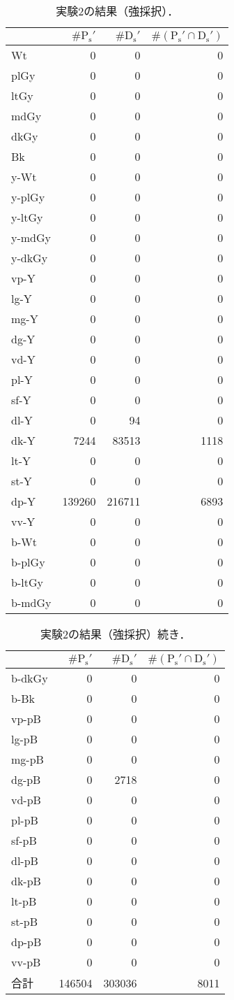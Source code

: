 \documentclass[uplatex,paper=a4,fontsize=4.0truemm,jafontsize=4.0truemm,head_space=30.0truemm,foot_space=30.0truemm,baselineskip=8.0truemm,line_length=40zw,gutter=25.0truemm,oneside,openany,fleqn,hanging_panctuation,open_bracket_pos=nibu_tentsuki,dvipdfmx,jis2004,book,titlepage]{jlreq}
\theoremstyle{mystyle}
\newcommand{\zwspace}{\hspace{1zw}\relax}
\newcommand{\captiondot}[1]{\caption{#1．}}
\newcommand{\tableinput}[4]{\begin{table}[btp]\centering\captiondot{#3}\label{tab:#4}\begin{tabular}{#1}#2\end{tabular}\end{table}}
\newcommand{\parentheses}[1]{\left(#1\right)}
\begin{document}
			\clearpage
			\tableinput{l|rrr}{ & \(\#\textrm{P}_\textrm{s}'\) & \(\#\textrm{D}_\textrm{s}'\) & \(\#\parentheses{\textrm{P}_\textrm{s}'\cap\textrm{D}_\textrm{s}'}\) \\ \hline
				Wt & 0 & 0 & 0 \\
				plGy & 0 & 0 & 0 \\
				ltGy & 0 & 0 & 0 \\
				mdGy & 0 & 0 & 0 \\
				dkGy & 0 & 0 & 0 \\
				Bk & 0 & 0 & 0 \\
				y-Wt & 0 & 0 & 0 \\
				y-plGy & 0 & 0 & 0 \\
				y-ltGy & 0 & 0 & 0 \\
				y-mdGy & 0 & 0 & 0 \\
				y-dkGy & 0 & 0 & 0 \\
				vp-Y & 0 & 0 & 0 \\
				lg-Y & 0 & 0 & 0 \\
				mg-Y & 0 & 0 & 0 \\
				dg-Y & 0 & 0 & 0 \\
				vd-Y & 0 & 0 & 0 \\
				pl-Y & 0 & 0 & 0 \\
				sf-Y & 0 & 0 & 0 \\
				dl-Y & 0 & 94 & 0 \\
				dk-Y & 7244 & 83513 & 1118 \\
				lt-Y & 0 & 0 & 0 \\
				st-Y & 0 & 0 & 0 \\
				dp-Y & 139260 & 216711 & 6893 \\
				vv-Y & 0 & 0 & 0 \\
				b-Wt & 0 & 0 & 0 \\
				b-plGy & 0 & 0 & 0 \\
				b-ltGy & 0 & 0 & 0 \\
				b-mdGy & 0 & 0 & 0}{実験2の結果（強採択）}{result23}
			\tableinput{l|rrr}{ & \(\#\textrm{P}_\textrm{s}'\) & \(\#\textrm{D}_\textrm{s}'\) & \(\#\parentheses{\textrm{P}_\textrm{s}'\cap\textrm{D}_\textrm{s}'}\) \\ \hline
				b-dkGy & 0 & 0 & 0 \\
				b-Bk & 0 & 0 & 0 \\
				vp-pB & 0 & 0 & 0 \\
				lg-pB & 0 & 0 & 0 \\
				mg-pB & 0 & 0 & 0 \\
				dg-pB & 0 & 2718 & 0 \\
				vd-pB & 0 & 0 & 0 \\
				pl-pB & 0 & 0 & 0 \\
				sf-pB & 0 & 0 & 0 \\
				dl-pB & 0 & 0 & 0 \\
				dk-pB & 0 & 0 & 0 \\
				lt-pB & 0 & 0 & 0 \\
				st-pB & 0 & 0 & 0 \\
				dp-pB & 0 & 0 & 0 \\
				vv-pB & 0 & 0 & 0 \\ \hline
				合計 & 146504 & 303036 & 8011}{実験2の結果（強採択）\zwspace 続き}{result26}
				\clearpage
\end{document}
